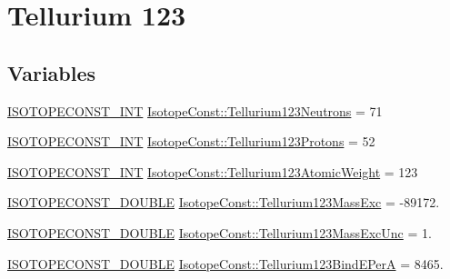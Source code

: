 \hypertarget{group___isotope_const-_tellurium-_te123}{}\section{Tellurium 123}
\label{group___isotope_const-_tellurium-_te123}
\subsection*{Variables}
\begin{DoxyCompactItemize}
\item 
\mbox{\hyperlink{group___isotope_const-_macros_ga5f18360b3e99483a35c32d789e62621c}{I\+S\+O\+T\+O\+P\+E\+C\+O\+N\+S\+T\+\_\+\+I\+NT}} \mbox{\hyperlink{group___isotope_const-_tellurium-_te123_ga73a505544bc97fa057e72bb3aa0cce11}{Isotope\+Const\+::\+Tellurium123\+Neutrons}} = 71
\item 
\mbox{\hyperlink{group___isotope_const-_macros_ga5f18360b3e99483a35c32d789e62621c}{I\+S\+O\+T\+O\+P\+E\+C\+O\+N\+S\+T\+\_\+\+I\+NT}} \mbox{\hyperlink{group___isotope_const-_tellurium-_te123_gab0a2bb6d32f347892840b8bd1c7c7512}{Isotope\+Const\+::\+Tellurium123\+Protons}} = 52
\item 
\mbox{\hyperlink{group___isotope_const-_macros_ga5f18360b3e99483a35c32d789e62621c}{I\+S\+O\+T\+O\+P\+E\+C\+O\+N\+S\+T\+\_\+\+I\+NT}} \mbox{\hyperlink{group___isotope_const-_tellurium-_te123_gaca5386f057b089c1cf2a6a89e54232de}{Isotope\+Const\+::\+Tellurium123\+Atomic\+Weight}} = 123
\item 
\mbox{\hyperlink{group___isotope_const-_macros_ga8f45a7272ce02c0b4c65c44636ed719a}{I\+S\+O\+T\+O\+P\+E\+C\+O\+N\+S\+T\+\_\+\+D\+O\+U\+B\+LE}} \mbox{\hyperlink{group___isotope_const-_tellurium-_te123_ga9cd9f5c246a6f1d088aaf169498bd81a}{Isotope\+Const\+::\+Tellurium123\+Mass\+Exc}} = -\/89172.
\item 
\mbox{\hyperlink{group___isotope_const-_macros_ga8f45a7272ce02c0b4c65c44636ed719a}{I\+S\+O\+T\+O\+P\+E\+C\+O\+N\+S\+T\+\_\+\+D\+O\+U\+B\+LE}} \mbox{\hyperlink{group___isotope_const-_tellurium-_te123_ga1f7a28f3f430bbd516491103b5a89dc7}{Isotope\+Const\+::\+Tellurium123\+Mass\+Exc\+Unc}} = 1.
\item 
\mbox{\hyperlink{group___isotope_const-_macros_ga8f45a7272ce02c0b4c65c44636ed719a}{I\+S\+O\+T\+O\+P\+E\+C\+O\+N\+S\+T\+\_\+\+D\+O\+U\+B\+LE}} \mbox{\hyperlink{group___isotope_const-_tellurium-_te123_gaafe421f124d0e73f889d80a27ed448cc}{Isotope\+Const\+::\+Tellurium123\+Bind\+E\+PerA}} = 8465.
\item 

\end{DoxyCompactItemize}
